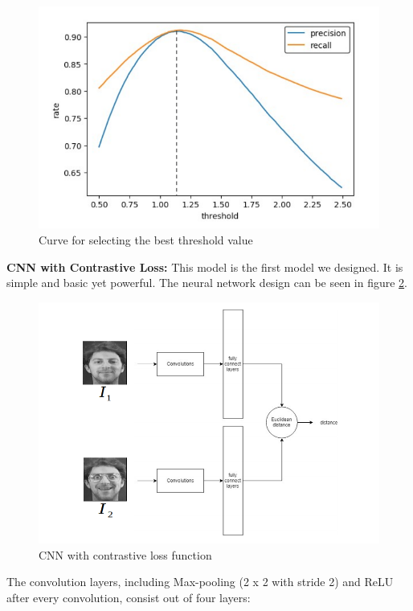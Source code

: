 \begin{figure}[H]
  \includegraphics[scale=0.6]{fig/threshold.png}
  \centering
  \caption{Curve for selecting the best threshold value}
  \label{fig:threshold}
\end{figure}

\textbf{CNN with Contrastive Loss:} This model is the first model we designed. It is simple and basic yet powerful. The neural network design can be seen in figure \ref{fig:ccncl}.

\begin{figure}[H]
  \includegraphics[scale=0.7]{fig/cnncl.png}
  \centering
  \caption{CNN with contrastive loss function}
  \label{fig:ccncl}
\end{figure}

The convolution layers, including Max-pooling (2 x 2 with stride 2) and ReLU after every convolution, consist out of four layers:

